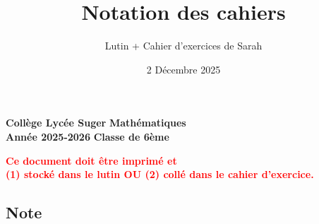 \documentclass[answers]{exam}
\title{Notation des cahiers}
\author{Lutin + Cahier d'exercices de Sarah}
\date{2 Décembre 2025}
\begin{document}
\textbf{Collège Lycée Suger}
\hfill
\textbf{Mathématiques} \\

\textbf{Année 2025-2026}
\hfill
\textbf{Classe de 6ème} \par

{\let\newpage\relax\maketitle}

\begin{tcolorbox}[
  colframe=red!90!black,
  fonttitle=\bfseries,
  boxsep=4pt,
  sharp corners,
]
\begin{center}
\textbf{\textcolor{red}{Ce document doit être imprimé et \\ (1) stocké dans le lutin OU (2) collé dans le cahier d'exercice.}}
\end{center}
\end{tcolorbox}

\subsection*{Note}
\end{document}
